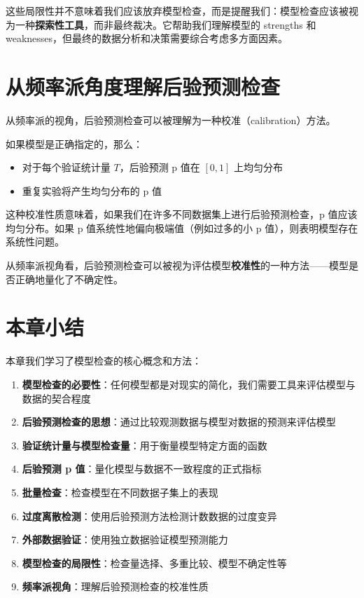 \begin{Remark}
  这些局限性并不意味着我们应该放弃模型检查，而是提醒我们：模型检查应该被视为一种\textbf{探索性工具}，而非最终裁决。它帮助我们理解模型的 strengths 和 weaknesses，但最终的数据分析和决策需要综合考虑多方面因素。
\end{Remark}

\section{从频率派角度理解后验预测检查}

从频率派的视角，后验预测检查可以被理解为一种校准（calibration）方法。

如果模型是正确指定的，那么：
\begin{itemize}
  \item 对于每个验证统计量 $T$，后验预测 p 值在 $[0, 1]$ 上均匀分布
  \item 重复实验将产生均匀分布的 p 值
\end{itemize}

这种校准性质意味着，如果我们在许多不同数据集上进行后验预测检查，p 值应该均匀分布。如果 p 值系统性地偏向极端值（例如过多的小 p 值），则表明模型存在系统性问题。

从频率派视角看，后验预测检查可以被视为评估模型\textbf{校准性}的一种方法——模型是否正确地量化了不确定性。

\section{本章小结}

本章我们学习了模型检查的核心概念和方法：

\begin{enumerate}
  \item \textbf{模型检查的必要性}：任何模型都是对现实的简化，我们需要工具来评估模型与数据的契合程度
  \item \textbf{后验预测检查的思想}：通过比较观测数据与模型对数据的预测来评估模型
  \item \textbf{验证统计量与模型检查量}：用于衡量模型特定方面的函数
  \item \textbf{后验预测 p 值}：量化模型与数据不一致程度的正式指标
  \item \textbf{批量检查}：检查模型在不同数据子集上的表现
  \item \textbf{过度离散检测}：使用后验预测方法检测计数数据的过度变异
  \item \textbf{外部数据验证}：使用独立数据验证模型预测能力
  \item \textbf{模型检查的局限性}：检查量选择、多重比较、模型不确定性等
  \item \textbf{频率派视角}：理解后验预测检查的校准性质
\end{enumerate}

